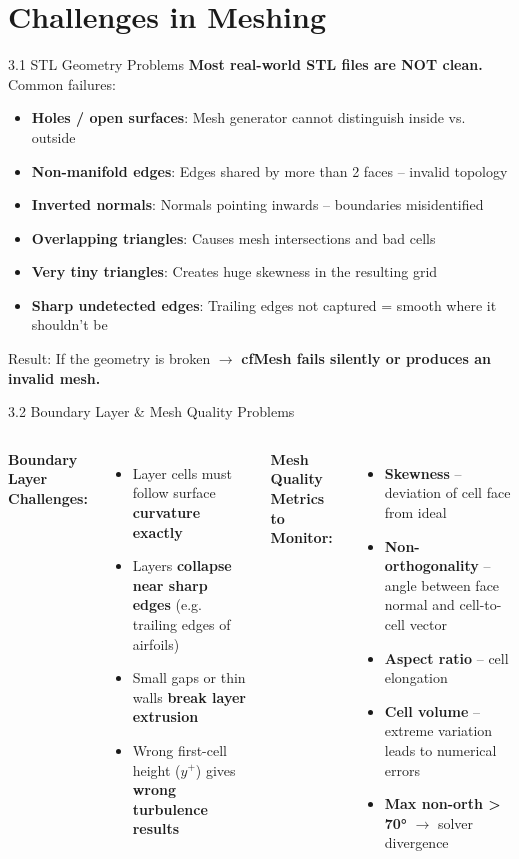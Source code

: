 \documentclass[dvipsnames,mathserif]{beamer}
\begin{document}
\section{Challenges in Meshing}
\begin{frame}{3.1 STL Geometry Problems}
    \textbf{Most real-world STL files are NOT clean.} Common failures:
    \begin{itemize}
        \item \textbf{Holes / open surfaces}: Mesh generator cannot distinguish inside vs. outside
        \item \textbf{Non-manifold edges}: Edges shared by more than 2 faces -- invalid topology
        \item \textbf{Inverted normals}: Normals pointing inwards -- boundaries misidentified
        \item \textbf{Overlapping triangles}: Causes mesh intersections and bad cells
        \item \textbf{Very tiny triangles}: Creates huge skewness in the resulting grid
        \item \textbf{Sharp undetected edges}: Trailing edges not captured = smooth where it shouldn't be
    \end{itemize}
    \vspace{0.2cm}
    \begin{block}{Result:}
        If the geometry is broken $\rightarrow$ \textbf{cfMesh fails silently or produces an invalid mesh.}
    \end{block}
\end{frame}

\begin{frame}{3.2 Boundary Layer \& Mesh Quality Problems}
    \begin{columns}
    \textbf{Boundary Layer Challenges:}
    \begin{itemize}
        \item Layer cells must follow surface \textbf{curvature exactly}
        \item Layers \textbf{collapse near sharp edges} (e.g. trailing edges of airfoils)
        \item Small gaps or thin walls \textbf{break layer extrusion}
        \item Wrong first-cell height ($y^+$) gives \textbf{wrong turbulence results}
    \end{itemize}
    \textbf{Mesh Quality Metrics to Monitor:}
    \begin{itemize}
        \item \textbf{Skewness} -- deviation of cell face from ideal
        \item \textbf{Non-orthogonality} -- angle between face normal and cell-to-cell vector
        \item \textbf{Aspect ratio} -- cell elongation
        \item \textbf{Cell volume} -- extreme variation leads to numerical errors
        \item \textbf{Max non-orth > 70°} $\rightarrow$ solver divergence
    \end{itemize}
    \end{columns}
\end{frame}
\end{document}
